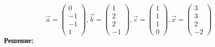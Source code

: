 \documentclass[a4paper]{article}
\begin{document}
	$$\overrightarrow{a} = \begin{pmatrix} 0 \\ -1 \\ -1 \\ 1 \end{pmatrix}, \overrightarrow{b} = \begin{pmatrix} 1 \\ 2 \\ 2 \\ -1 \end{pmatrix}, \overrightarrow{c} = \begin{pmatrix} 1 \\ 1 \\ 1 \\ 0 \end{pmatrix}, \overrightarrow{x} = \begin{pmatrix} 3 \\ 3 \\ 2 \\ -2 \end{pmatrix}$$
	\textbf{Решение:}
\end{document}
